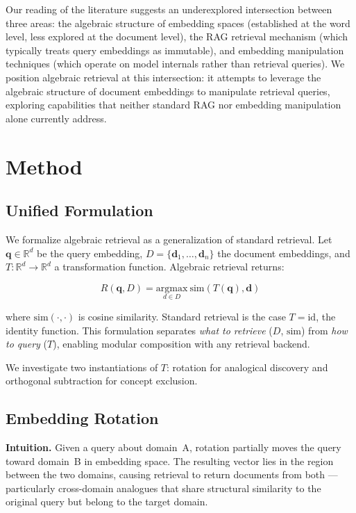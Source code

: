 \documentclass{article}
\begin{document}
Our reading of the literature suggests an underexplored intersection between three areas: the algebraic structure of embedding spaces (established at the word level, less explored at the document level), the RAG retrieval mechanism (which typically treats query embeddings as immutable), and embedding manipulation techniques (which operate on model internals rather than retrieval queries). We position algebraic retrieval at this intersection: it attempts to leverage the algebraic structure of document embeddings to manipulate retrieval queries, exploring capabilities that neither standard RAG nor embedding manipulation alone currently address.

\section{Method}

\subsection{Unified Formulation}

We formalize algebraic retrieval as a generalization of standard retrieval. Let $\mathbf{q} \in \mathbb{R}^d$ be the query embedding, $D = \{\mathbf{d}_1, \ldots, \mathbf{d}_n\}$ the document embeddings, and $T : \mathbb{R}^d \to \mathbb{R}^d$ a transformation function. Algebraic retrieval returns:

\begin{equation}
R(\mathbf{q}, D) = \underset{d \in D}{\text{argmax}} \ \text{sim}(T(\mathbf{q}), \mathbf{d})
\end{equation}

where $\text{sim}(\cdot, \cdot)$ is cosine similarity. Standard retrieval is the case $T = \text{id}$, the identity function. This formulation separates \emph{what to retrieve} ($D$, $\text{sim}$) from \emph{how to query} ($T$), enabling modular composition with any retrieval backend.

We investigate two instantiations of $T$: rotation for analogical discovery and orthogonal subtraction for concept exclusion.

\subsection{Embedding Rotation}

\textbf{Intuition.} Given a query about domain~A, rotation partially moves the query toward domain~B in embedding space. The resulting vector lies in the region between the two domains, causing retrieval to return documents from both --- particularly cross-domain analogues that share structural similarity to the original query but belong to the target domain.
\end{document}
